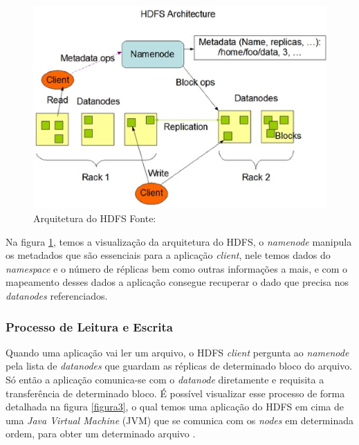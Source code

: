                 \begin{figure}[ht!]
                    \centering
                    \includegraphics[keepaspectratio=true,scale=0.75]
                        {figuras/figura2.eps}
                    \caption[Arquitetura do HDFS]{Arquitetura do HDFS
                    \protect\linebreak Fonte: }
                    \label{figura2}
                \end{figure}

                Na figura \ref{figura2}, temos a visualização da arquitetura do HDFS, o \textit{namenode} manipula
                os metadados que são essenciais para a aplicação \textit{client}, nele temos dados do \textit{namespace}
                e o número de réplicas bem como outras informações a mais, e com o mapeamento desses dados a
                aplicação consegue recuperar o dado que precisa nos \textit{datanodes} referenciados.

            \subsubsection{Processo de Leitura e Escrita}

                Quando uma aplicação vai ler um arquivo, o HDFS \textit{client} pergunta ao \textit{namenode} pela
                lista de \textit{datanodes} que guardam as réplicas de determinado bloco do arquivo. Só então a
                aplicação comunica-se com o \textit{datanode} diretamente e requisita a transferência de determinado
                bloco. É possível visualizar esse processo de forma detalhada na figura \ref{figura3}, o qual temos uma aplicação do
                HDFS em cima de uma \textit{Java Virtual Machine} (JVM) que se comunica com os \textit{nodes} em
                determinada ordem, para obter um determinado arquivo \cite{shvachko2010}.


